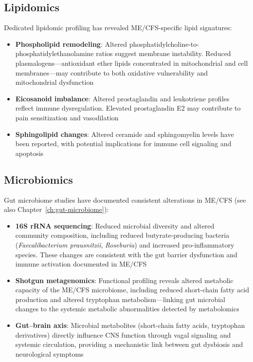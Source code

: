 \subsection{Lipidomics}

Dedicated lipidomic profiling has revealed ME/CFS-specific lipid signatures:

\begin{itemize}
    \item \textbf{Phospholipid remodeling}: Altered phosphatidylcholine-to-phosphatidylethanolamine ratios suggest membrane instability. Reduced plasmalogens---antioxidant ether lipids concentrated in mitochondrial and cell membranes---may contribute to both oxidative vulnerability and mitochondrial dysfunction
    \item \textbf{Eicosanoid imbalance}: Altered prostaglandin and leukotriene profiles reflect immune dysregulation. Elevated prostaglandin E2 may contribute to pain sensitization and vasodilation
    \item \textbf{Sphingolipid changes}: Altered ceramide and sphingomyelin levels have been reported, with potential implications for immune cell signaling and apoptosis
\end{itemize}

\subsection{Microbiomics}

Gut microbiome studies have documented consistent alterations in ME/CFS (see also Chapter~\ref{ch:gut-microbiome}):

\begin{itemize}
    \item \textbf{16S rRNA sequencing}: Reduced microbial diversity and altered community composition, including reduced butyrate-producing bacteria (\textit{Faecalibacterium prausnitzii}, \textit{Roseburia}) and increased pro-inflammatory species. These changes are consistent with the gut barrier dysfunction and immune activation documented in ME/CFS
    \item \textbf{Shotgun metagenomics}: Functional profiling reveals altered metabolic capacity of the ME/CFS microbiome, including reduced short-chain fatty acid production and altered tryptophan metabolism---linking gut microbial changes to the systemic metabolic abnormalities detected by metabolomics
    \item \textbf{Gut--brain axis}: Microbial metabolites (short-chain fatty acids, tryptophan derivatives) directly influence CNS function through vagal signaling and systemic circulation, providing a mechanistic link between gut dysbiosis and neurological symptoms
\end{itemize}

